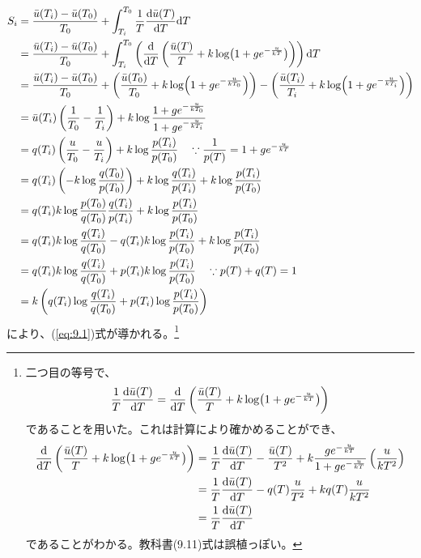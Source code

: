 \documentclass[a4paper,11pt]{jsarticle}
\numberwithin{equation}{section}
\begin{document}
\begin{align}
    S_i &= \frac{\bar{u}(T_i)-\bar{u}(T_0)}{T_0} + \int_{T_i}^{T_0}\frac{1}{T}\frac{\dd \bar{u}(T)}{\dd T}\dd T \\
    &= \frac{\bar{u}(T_i)-\bar{u}(T_0)}{T_0} + \int_{T_i}^{T_0}\left(\dv{T} \left(\frac{\bar{u}(T)}{T} +k\log(1+ge^{-\frac{u}{kT}})\right)\right)\dd T \\
    &= \frac{\bar{u}(T_i)-\bar{u}(T_0)}{T_0} + \left(\frac{\bar{u}(T_0)}{T_0} +k\log(1+ge^{-\frac{u}{kT_0}})\right) - \left(\frac{\bar{u}(T_i)}{T_i} +k\log(1+ge^{-\frac{u}{kT_i}})\right) \\
    &= \bar{u}(T_i)\left(\frac{1}{T_0} - \frac{1}{T_i}\right) + k\log\frac{1+ge^{-\frac{u}{kT_0}}}{1+ge^{-\frac{u}{kT_i}}} \\
    &= q(T_i)\left(\frac{u}{T_0} - \frac{u}{T_i}\right) + k\log\frac{p(T_i)}{p(T_0)} \quad \because \frac{1}{p(T)} = 1+ge^{-\frac{u}{kT}}\\
    &= q(T_i)\left(-k\log\frac{q(T_0)}{p(T_0)}\right) + k\log\frac{q(T_i)}{p(T_i)} + k\log\frac{p(T_i)}{p(T_0)} \\
    &= q(T_i)k\log\frac{p(T_0)}{q(T_0)}\frac{q(T_i)}{p(T_i)} + k\log\frac{p(T_i)}{p(T_0)} \\
    &= q(T_i)k\log\frac{q(T_i)}{q(T_0)} - q(T_i)k\log\frac{p(T_i)}{p(T_0)} + k\log\frac{p(T_i)}{p(T_0)} \\
    &= q(T_i)k\log\frac{q(T_i)}{q(T_0)} + p(T_i)k\log\frac{p(T_i)}{p(T_0)} \quad \because p(T) + q(T) = 1\\
    &= k\left(q(T_i)\log\frac{q(T_i)}{q(T_0)} + p(T_i)\log\frac{p(T_i)}{p(T_0)}\right)
\end{align}
により、(\ref{eq:9.1})式が導かれる。\footnote{
    二つ目の等号で、
    \begin{align}
        \frac{1}{T}\dv{\bar{u}(T)}{T} = \dv{T}\left(\frac{\bar{u}(T)}{T} + k\log(1+ge^{-\frac{u}{kT}})\right)
    \end{align}
    であることを用いた。これは計算により確かめることができ、
    \begin{align}
        \dv{T}\left(\frac{\bar{u}(T)}{T} + k\log(1+ge^{-\frac{u}{kT}})\right) &= \frac{1}{T}\dv{\bar{u}(T)}{T} - \frac{\bar{u}(T)}{T^2} + k\frac{ge^{-\frac{u}{kT}}}{1+ge^{-\frac{u}{kT}}}\left(\frac{u}{kT^2}\right) \\
        &= \frac{1}{T}\dv{\bar{u}(T)}{T} -q(T)\frac{u}{T^2} +kq(T)\frac{u}{kT^2} \\
        &= \frac{1}{T}\dv{\bar{u}(T)}{T} 
    \end{align}
    であることがわかる。教科書(9.11)式は誤植っぽい。
}\hfill\qedsymbol\\
\end{document}
